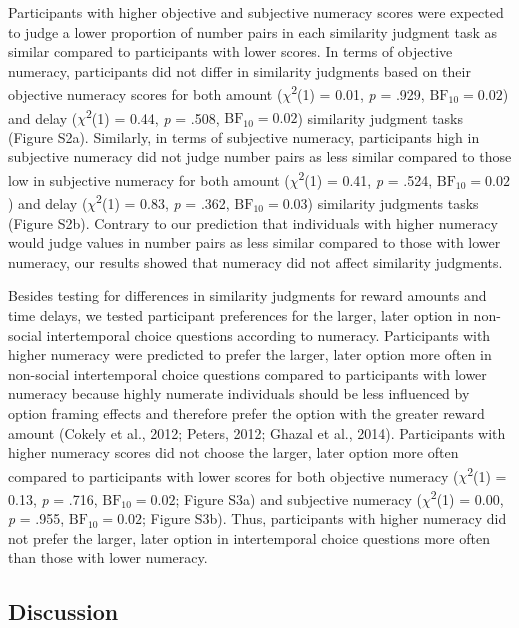 \documentclass[
  pub,floatsintext]{apa6}
\begin{document}
Participants with higher objective and subjective numeracy scores were expected to judge a lower proportion of number pairs in each similarity judgment task as similar compared to participants with lower scores. In terms of objective numeracy, participants did not differ in similarity judgments based on their objective numeracy scores for both amount (\(\chi\)\textsuperscript{2}(1) = 0.01, \emph{p} = .929, \(\mathrm{BF}_{\textrm{10}} = 0.02\)) and delay (\(\chi\)\textsuperscript{2}(1) = 0.44, \emph{p} = .508, \(\mathrm{BF}_{\textrm{10}} = 0.02\)) similarity judgment tasks (Figure S2a). Similarly, in terms of subjective numeracy, participants high in subjective numeracy did not judge number pairs as less similar compared to those low in subjective numeracy for both amount (\(\chi\)\textsuperscript{2}(1) = 0.41, \emph{p} = .524, \(\mathrm{BF}_{\textrm{10}} = 0.02\)) and delay (\(\chi\)\textsuperscript{2}(1) = 0.83, \emph{p} = .362, \(\mathrm{BF}_{\textrm{10}} = 0.03\)) similarity judgments tasks (Figure S2b). Contrary to our prediction that individuals with higher numeracy would judge values in number pairs as less similar compared to those with lower numeracy, our results showed that numeracy did not affect similarity judgments.

Besides testing for differences in similarity judgments for reward amounts and time delays, we tested participant preferences for the larger, later option in non-social intertemporal choice questions according to numeracy. Participants with higher numeracy were predicted to prefer the larger, later option more often in non-social intertemporal choice questions compared to participants with lower numeracy because highly numerate individuals should be less influenced by option framing effects and therefore prefer the option with the greater reward amount (Cokely et al., 2012; Peters, 2012; Ghazal et al., 2014). Participants with higher numeracy scores did not choose the larger, later option more often compared to participants with lower scores for both objective numeracy (\(\chi\)\textsuperscript{2}(1) = 0.13, \emph{p} = .716, \(\mathrm{BF}_{\textrm{10}} = 0.02\); Figure S3a) and subjective numeracy (\(\chi\)\textsuperscript{2}(1) = 0.00, \emph{p} = .955, \(\mathrm{BF}_{\textrm{10}} = 0.02\); Figure S3b). Thus, participants with higher numeracy did not prefer the larger, later option in intertemporal choice questions more often than those with lower numeracy.

\hypertarget{discussion}{%
\subsection{Discussion}\label{discussion}}
\end{document}
